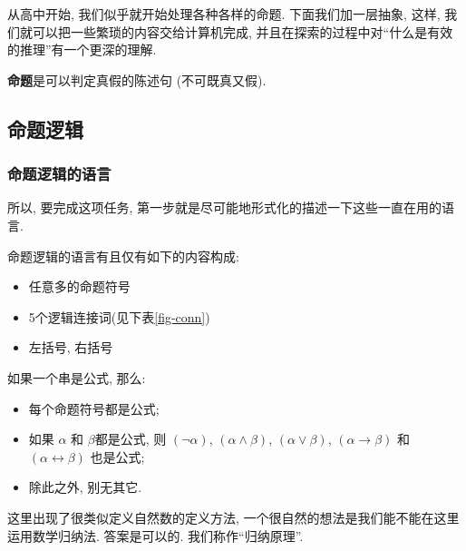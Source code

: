 
    从高中开始, 我们似乎就开始处理各种各样的命题. 下面我们加一层抽象, 这样, 我们就可以把一些繁琐的内容交给计算机完成, 并且在探索的过程中对``什么是有效的推理''有一个更深的理解. 
    \begin{definition}[命题 (Proposition)]
        {\bf 命题}是可以判定真假的陈述句 (不可既真又假). 
      \end{definition}

    \subsection{命题逻辑}

    \subsubsection{命题逻辑的语言}
    所以, 要完成这项任务, 第一步就是尽可能地形式化的描述一下这些一直在用的语言. 
    \begin{definition}[命题逻辑的语言]
        命题逻辑的语言有且仅有如下的内容构成: 
        \begin{itemize}
            \item 任意多的命题符号
            \item 5个逻辑连接词(见下表\ref{fig-conn})
            \item 左括号, 右括号
        \end{itemize}
    \end{definition}
    

    \begin{definition}[公式]
        如果一个串是公式, 那么: 
        \begin{itemize}
            \item 每个命题符号都是公式;
            \item 如果 $\alpha$ 和 $\beta$都是公式,
              则 $(\lnot \alpha)$, $(\alpha \land \beta)$, $(\alpha \lor \beta)$,
              $(\alpha \to \beta)$ 和 $(\alpha \leftrightarrow \beta)$ 也是公式;
            \item 除此之外, 别无其它. 
        \end{itemize}
    \end{definition}

    这里出现了很类似定义自然数的定义方法, 一个很自然的想法是我们能不能在这里运用数学归纳法. 答案是可以的. 我们称作``归纳原理''. 
    
